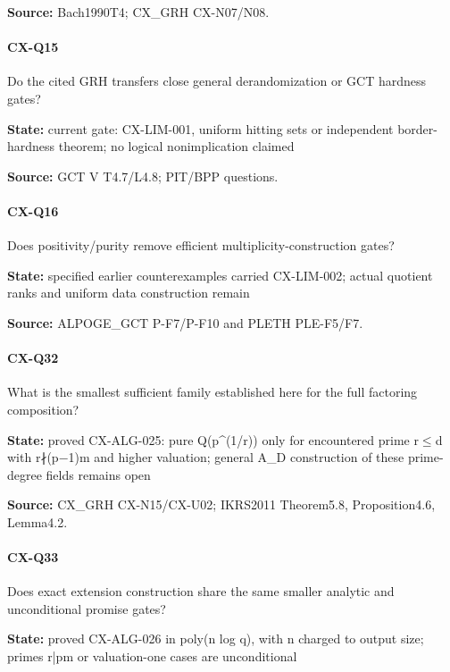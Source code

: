 \documentclass[11pt,a4paper]{article}
\begin{document}
\textbf{Source:} Bach1990T4; CX\_\allowbreak{}GRH CX-N07/\allowbreak{}N08.

\paragraph{CX-Q15} Do the cited GRH transfers close general derandomization or GCT hardness gates?

\textbf{State:} current gate:\allowbreak{} CX-LIM-001, uniform hitting sets or independent border-hardness theorem; no logical nonimplication claimed

\textbf{Source:} GCT V T4.\allowbreak{}7/\allowbreak{}L4.\allowbreak{}8; PIT/\allowbreak{}BPP questions.

\paragraph{CX-Q16} Does positivity/\allowbreak{}purity remove efficient multiplicity-construction gates?

\textbf{State:} specified earlier counterexamples carried CX-LIM-002; actual quotient ranks and uniform data construction remain

\textbf{Source:} ALPOGE\_\allowbreak{}GCT P-F7/\allowbreak{}P-F10 and PLETH PLE-F5/\allowbreak{}F7.

\paragraph{CX-Q32} What is the smallest sufficient family established here for the full factoring composition?

\textbf{State:} proved CX-ALG-025:\allowbreak{} pure Q(p\textasciicircum{}(1/\allowbreak{}r)) only for encountered prime r\ensuremath{\le}d with r∤(p\ensuremath{-}1)m and higher valuation; general A\_\allowbreak{}D construction of these prime-degree fields remains open

\textbf{Source:} CX\_\allowbreak{}GRH CX-N15/\allowbreak{}CX-U02; IKRS2011 Theorem5.\allowbreak{}8, Proposition4.\allowbreak{}6, Lemma4.\allowbreak{}2.

\paragraph{CX-Q33} Does exact extension construction share the same smaller analytic and unconditional promise gates?

\textbf{State:} proved CX-ALG-026 in poly(n log q), with n charged to output size; primes r|pm or valuation-one cases are unconditional
\end{document}
